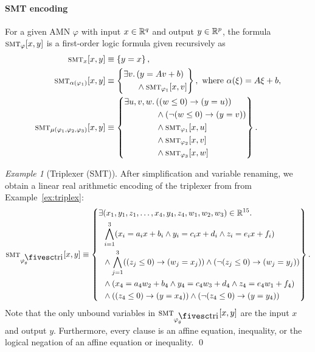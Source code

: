 \documentclass[10pt]{article}
\newcommand{\amn}{\varphi}
\newcommand{\smt}{\mbox{\sc smt}}
\theoremstyle{remark}
\newtheorem{example}{Example}
\theoremstyle{definition}
\theoremstyle{plain}
\begin{document}
\paragraph{SMT encoding}
For a given AMN $\amn$ with input $x\in\mathbb{R}^q$ and output
$y\in\mathbb{R}^p$, the formula $\smt_\amn[x,y]$ is a first-order logic formula
given recursively as
\begin{align}
	\smt_{x}[x,y]
	&\equiv
	\left\{
		y = x
	\right\},\label{eq:smt_enc_var}
	\\
	\smt_{\alpha(\amn_1)}[x,y]
	&\equiv 
	\left\{
		\begin{aligned}
			\exists v.\, 
			&(y = A v + b) \\
			& \wedge \smt_{\amn_1}[x,v]
		\end{aligned}
	\right\},
	\text{ where }
	\alpha(\xi) = A \xi + b,\label{eq:smt_enc_aff}
	\\
	\smt_{\mu(\amn_1,\amn_2,\amn_3)}[x,y]
	&\equiv 
	\left\{
		\begin{aligned}
		\exists u, v, w.\,
			& ((w \leq 0) \rightarrow (y = u)) \\
			& \wedge (\neg(w \leq 0) \rightarrow (y = v)) \\
			& \wedge \smt_{\amn_1}[x, u] \\
			& \wedge \smt_{\amn_2}[x, v] \\
			& \wedge \smt_{\amn_3}[x, w]
		\end{aligned}
	\right\}.\label{eq:smt_enc_mu}
\end{align}

\begin{example}[Triplexer (SMT)]
After simplification and variable renaming, we obtain a linear real
arithmetic encoding of the triplexer from from Example~\ref{ex:triplex}:
\[
	\smt_{\amn_\theta^\mathsc{tri}}[x,y]
	\equiv
	\left\{
	\begin{aligned}
	\exists &(x_1,y_1,z_1,\ldots,x_4,y_4,z_4,w_1,w_2,w_3)\in\reals^{15}.\\
	& \bigwedge_{i=1}^{3} 
		(x_i = a_i x + b_i \wedge
		y_i = c_i x + d_i \wedge
		z_i = e_i x + f_i)\\
	& \wedge \bigwedge_{j=1}^{3} 
		((z_j \leq 0) \rightarrow (w_j=x_j))
		\wedge (\neg (z_j \leq 0) \rightarrow (w_j=y_j))\\
	& \wedge (x_4 = a_4 w_2 + b_4 \wedge
		y_4 = c_4 w_3 + d_4 \wedge
		z_4 = e_4 w_1 + f_4) \\
	& \wedge 
		((z_4 \leq 0) \rightarrow (y=x_4))
		\wedge (\neg (z_4 \leq 0) \rightarrow (y=y_4))
	\end{aligned}
	\right\}.
\]
Note that the only unbound variables in $\smt_{\amn_\theta^\mathsc{tri}}[x,y]$
are the input $x$ and output $y$. Furthermore, every clause is an affine
equation, inequality, or the logical negation of an affine equation or
inequality.
\qed
\end{example}
\end{document}
